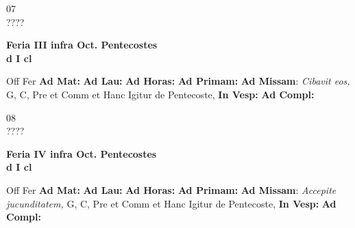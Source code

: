\documentclass[10pt, openany]{book}
\begin{document}
    \begin{center}
        \begin{minipage}{3.5in}
            \vspace{2em}
            \begin{minipage}{0.5in}
                {\Huge 07} \\
                {\normalsize ????}
            \end{minipage}
            \begin{minipage}{3.0in}
                \textbf{ \large Feria III infra Oct. Pentecostes \\
                \textnormal{\normalsize d I cl}}

            \end{minipage}
            \begin{justify}Off Fer
                \textbf{Ad Mat: }
                \textbf{Ad Lau: }
                \textbf{Ad Horas: }
                \textbf{Ad Primam: }\textbf{Ad Missam}: \textit{Cibavit eos,} G, C, Pre et Comm et Hanc Igitur de Pentecoste, 
                \textbf{In Vesp: }
                \textbf{Ad Compl: }
            \end{justify}
        \end{minipage}
    \end{center}

    \begin{center}
        \begin{minipage}{3.5in}
            \vspace{2em}
            \begin{minipage}{0.5in}
                {\Huge 08} \\
                {\normalsize ????}
            \end{minipage}
            \begin{minipage}{3.0in}
                \textbf{ \large Feria IV infra Oct. Pentecostes \\
                \textnormal{\normalsize d I cl}}

            \end{minipage}
            \begin{justify}Off Fer
                \textbf{Ad Mat: }
                \textbf{Ad Lau: }
                \textbf{Ad Horas: }
                \textbf{Ad Primam: }\textbf{Ad Missam}: \textit{Accepite jucunditatem,} G, C, Pre et Comm et Hanc Igitur de Pentecoste, 
                \textbf{In Vesp: }
                \textbf{Ad Compl: }
            \end{justify}
        \end{minipage}
    \end{center}
\end{document}

